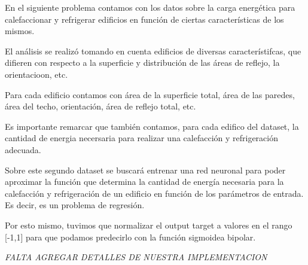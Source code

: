 En el siguiente problema contamos con los datos sobre la carga energética para calefaccionar y refrigerar edificios en función de ciertas características de los mismos.

El análisis se realizó tomando en cuenta edificios de diversas característifcas, que difieren con respecto a la superficie y distribución de las áreas de reflejo, la orientacioon, etc.

Para cada edificio contamos con área de la superficie total, área de las paredes, área del techo, orientación, área de reflejo total, etc.

Es importante remarcar que también contamos, para cada edifico del dataset, la cantidad de energia necersaria para realizar una calefacción y refrigeración adecuada.

Sobre este segundo dataset se buscará entrenar una red neuronal para poder aproximar la función que determina la cantidad de energía necesaria para la calefacción y refrigeración de un edificio en función de los parámetros de entrada. Es decir, es un problema de regresión.

Por esto mismo, tuvimos que normalizar el output target a valores en el rango [-1,1] para que podamos predecirlo con la función sigmoidea bipolar.

\emph{\color{red} FALTA AGREGAR DETALLES DE NUESTRA IMPLEMENTACION}
